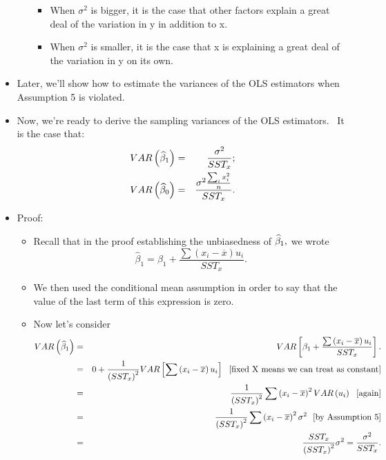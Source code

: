 \documentclass[11pt]{article}
\begin{document}
\begin{itemize}
\begin{itemize}
\begin{itemize}
\item When $\sigma ^{2}$ is bigger, it is the case that other factors
explain a great deal of the variation in y in addition to x.

\item When $\sigma ^{2}$ is smaller, it is the case that x is explaining a
great deal of the variation in y on its own.
\end{itemize}
\end{itemize}

\item Later, we'll show how to estimate the variances of the OLS estimators
when Assumption 5 is violated.

\item Now, we're ready to derive the sampling variances of the OLS
estimators. \ It is the case that:%
\begin{eqnarray*}
VAR\left( \widehat{\beta }_{1}\right) &=&\frac{\sigma ^{2}}{SST_{x}}; \\
VAR\left( \widehat{\beta }_{0}\right) &=&\frac{\sigma ^{2}\frac{%
\sum\nolimits_{i}x_{i}^{2}}{n}}{SST_{x}}.
\end{eqnarray*}

\item Proof:

\begin{itemize}
\item Recall that in the proof establishing the unbiasedness of $\widehat{%
\beta }_{1},$ we wrote 
\begin{equation*}
\widehat{\beta }_{1}=\beta _{1}+\frac{\sum \left( x_{i}-\overline{x}\right)
u_{i}}{SST_{x}}.
\end{equation*}

\item We then used the conditional mean assumption in order to say that the
value of the last term of this expression is zero.

\item Now let's consider%
\begin{eqnarray*}
VAR\left( \widehat{\beta }_{1}\right) &=&VAR\left[ \beta _{1}+\frac{\sum
\left( x_{i}-\overline{x}\right) u_{i}}{SST_{x}}\right] . \\
&=&0+\frac{1}{\left( SST_{x}\right) ^{2}}VAR\left[ \sum \left( x_{i}-%
\overline{x}\right) u_{i}\right] \text{ \ [fixed X means we can treat as
constant]} \\
&=&\frac{1}{\left( SST_{x}\right) ^{2}}\sum \left( x_{i}-\overline{x}\right)
^{2}VAR\left( u_{i}\right) \text{ \ [again]} \\
&=&\frac{1}{\left( SST_{x}\right) ^{2}}\sum \left( x_{i}-\overline{x}\right)
^{2}\sigma ^{2}\text{ \ [by Assumption 5]} \\
&=&\frac{SST_{x}}{\left( SST_{x}\right) ^{2}}\sigma ^{2}=\frac{\sigma ^{2}}{%
SST_{x}}.
\end{eqnarray*}
\end{itemize}


\end{itemize}
\end{document}
